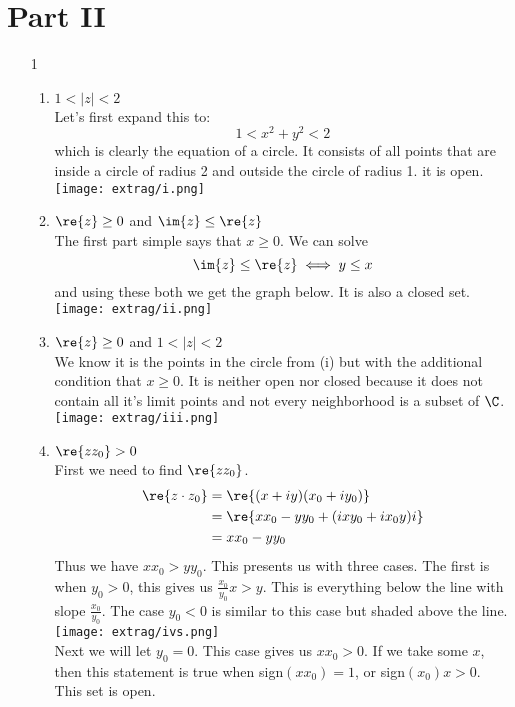 \documentclass{article}
\begin{document}
  \section{Part II}
  \begin{enumerate}
    \item[1]
      \begin{enumerate}[label=(\roman*)]
        \item $1<|z|<2$\\
          Let's first expand this to:
          \[1<x^2+y^2<2\] which is clearly the equation of a circle. It consists of all points that are inside a circle of radius 2 and outside the circle of radius 1. it is open.
          \\\texttt{[image: extrag/i.png]}
        \item $\re{z}\geq0$ and $\im{z}\leq \re{z}$\\
          The first part simple says that $x\geq0$. We can solve
          \[\im{z}\leq\re{z}\iff y\leq x\]
          and using these both we get the graph below. It is also a closed set.
          \\\texttt{[image: extrag/ii.png]}
        \item $\re{z}\geq0$ and $1<|z|<2$\\
          We know it is the points in the circle from (i) but with the additional condition that $x\geq0$. It is neither open nor closed because it does not contain all it's limit points and not every neighborhood is a subset of $\C$.\\
          \texttt{[image: extrag/iii.png]}
        \item $\re{zz_0}>0$\\
          First we need to find $\re{zz_0}$.
          \begin{align*}
            \re{z\cdot z_0}&=\re{(x+iy)(x_0+iy_0)}\\
            &=\re{xx_0-yy_0+(ixy_0+ix_0y)i}\\
            &=xx_0-yy_0\\
          \end{align*}
          Thus we have $xx_0>yy_0$. This presents us with three cases. The first is when $y_0>0$, this gives us $\frac{x_0}{y_0}x>y$. This is everything below the line with slope $\frac{x_0}{y_0}$. The case $y_0<0$ is similar to this case but shaded above the line.
          \\\texttt{[image: extrag/ivs.png]}\\
          Next we will let $y_0=0$. This case gives us $xx_0>0$. If we take some $x$, then this statement is true when sign$(xx_0)=1$, or sign$(x_0)x>0$. This set is open.

\end{enumerate}
\end{enumerate}
\end{document}
